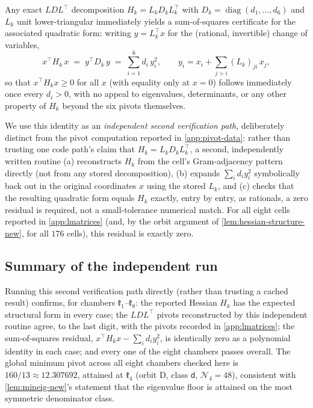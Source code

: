 \documentclass[11pt,reqno]{amsart}
\renewcommand{\_}{\origunderscore\allowbreak}
\numberwithin{equation}{section}
\theoremstyle{plain}
\theoremstyle{definition}
\theoremstyle{remark}
\newcommand{\Cell}[1]{\mathfrak{k}_{#1}}     %
\newcommand{\norm}[1]{\mathcal{N}_{#1}}      %
\DeclareMathOperator{\diag}{diag}
\begin{document}
Any exact $LDL^\top$ decomposition $H_k=L_kD_kL_k^\top$ with
$D_k=\diag(d_1,\dots,d_6)$ and $L_k$ unit lower-triangular immediately
yields a sum-of-squares certificate for the associated quadratic form:
writing $y=L_k^\top x$ for the (rational, invertible) change of
variables,
\[
  x^\top H_k\,x \;=\; y^\top D_k\,y \;=\; \sum_{i=1}^{6} d_i\,y_i^2,
  \qquad y_i = x_i+\sum_{j>i}(L_k)_{ji}\,x_j,
\]
so that $x^\top H_k x\ge0$ for all $x$ (with equality only at $x=0$)
follows immediately once every $d_i>0$, with no appeal to eigenvalues,
determinants, or any other property of $H_k$ beyond the six pivots
themselves.

We use this identity as an \emph{independent second verification path},
deliberately distinct from the pivot computation reported in
\cref{app:pivot-data}: rather than trusting one code path's claim that
$H_k=L_kD_kL_k^\top$, a second, independently written routine
(a) reconstructs $H_k$ from the cell's Gram-adjacency pattern directly
(not from any stored decomposition), (b) expands $\sum_i d_i y_i^2$
symbolically back out in the original coordinates $x$ using the stored
$L_k$, and (c) checks that the resulting quadratic form equals $H_k$
exactly, entry by entry, as rationals, a zero residual is required,
not a small-tolerance numerical match. For all eight cells reported
in \cref{app:lmatrices} (and, by the orbit argument of
\cref{lem:hessian-structure-new}, for all $176$ cells), this residual
is exactly zero.

\subsection{Summary of the independent run}

Running this second verification path directly (rather than trusting a
cached result) confirms, for chambers $\Cell1$--$\Cell8$: the reported
Hessian $H_k$ has the expected structural form in every case; the
$LDL^\top$ pivots reconstructed by this independent routine agree, to
the last digit, with the pivots recorded in \cref{app:lmatrices}; the
sum-of-squares residual, $x^\top H_kx - \sum_id_iy_i^2$, is identically
zero as a polynomial identity in each case; and every one of the eight
chambers passes overall. The global minimum pivot across all eight
chambers checked here is $160/13\approx12.307692$, attained at
$\Cell4$ (orbit D, class $\mathsf d$, $\norm4=48$), consistent with
\cref{lem:mineig-new}'s statement that the eigenvalue floor is attained
on the most symmetric denominator class.
\end{document}
